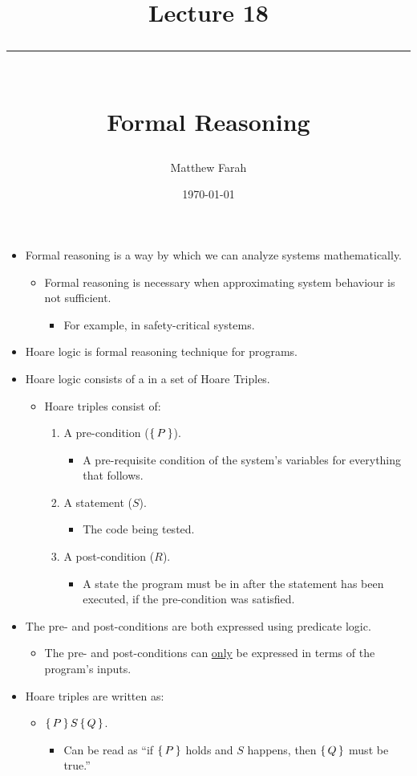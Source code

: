 \documentclass{article}
\date{
	\vspace{-.75em}
	{\large \today}
}
\title{
	\vspace*{-1.5em}
	{\Huge Lecture 18} \\
	\vspace{-1em}
	\rule{\textwidth/4}{.01em} \\
	\vspace{-.25em}
	{\Large Formal Reasoning}
	\vspace{-.75em}
}
\author{
	{\large Matthew Farah}
}
\newcounter{example}
\begin{document}
\maketitle
\pagestyle{fancy}

\fi

\begin{itemize}
	\item Formal reasoning is a way by which we can analyze systems mathematically.
	\begin{itemize}
		\item Formal reasoning is necessary when approximating system behaviour is not sufficient.
		\begin{itemize}
			\item For example, in safety-critical systems.
		\end{itemize}
	\end{itemize}
	\item Hoare logic is formal reasoning technique for programs.
	\item Hoare logic consists of a  in a set of Hoare Triples.
	\begin{itemize}
		\item Hoare triples consist of:
		\begin{enumerate}
			\item A pre-condition ($\set{P}$).
			\begin{itemize}
				\item A pre-requisite condition of the system's variables for everything that follows.
			\end{itemize}
			\item A statement ($S$).
			\begin{itemize}
				\item The code being tested.
			\end{itemize}
			\item A post-condition ($R$).
			\begin{itemize}
				\item A state the program must be in after the statement has been executed, if the pre-condition was satisfied.
			\end{itemize}
		\end{enumerate}
	\end{itemize}
	\item The pre- and post-conditions are both expressed using predicate logic.
	\begin{itemize}
		\item The pre- and post-conditions can \underline{only} be expressed in terms of the program's inputs.
	\end{itemize}
	\item Hoare triples are written as:
	\begin{itemize}
		\item $\set{P}S\set{Q}$.
		\begin{itemize}
			\item Can be read as ``if $\set{P}$ holds and $S$ happens, then $\set{Q}$ must be true.''
		\end{itemize}
	\end{itemize}
\end{itemize}
\end{document}
